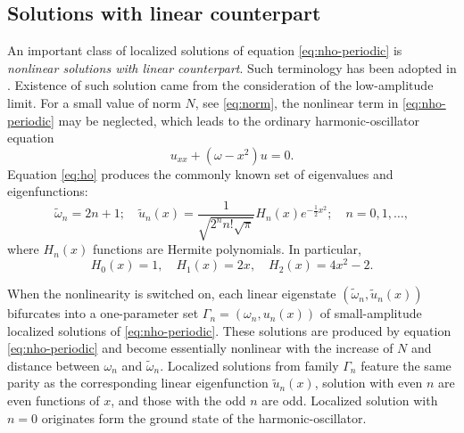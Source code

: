 \subsection{Solutions with linear counterpart}

An important class of localized solutions of equation \eqref{eq:nho-periodic} is {\it nonlinear solutions with linear counterpart}.
Such terminology has been adopted in \cite{AgostaMalomedPresilla, AgostaPresilla}.
Existence of such solution came from the consideration of the low-amplitude limit.
For a small value of norm $N$, see \eqref{eq:norm}, the nonlinear term in \eqref{eq:nho-periodic} may be neglected, which leads to the ordinary harmonic-oscillator equation
\begin{equation}
	u_{xx} + (\omega - x^2) u = 0.
\label{eq:ho}
\end{equation}
Equation \eqref{eq:ho} produces the commonly known set of eigenvalues and eigenfunctions:
\begin{equation}
	\tilde{\omega}_n = 2n + 1; \quad \tilde{u}_n(x) = \dfrac{1}{\sqrt{2^n n! \sqrt{\pi}}} H_n(x) e^{-\frac{1}{2} x^2}; \quad n = 0, 1, \dots,
\label{eq:ho-solutions}
\end{equation}
where $H_n(x)$ functions are Hermite polynomials.
In particular,
\begin{equation*}
	H_0(x) = 1, \quad H_1(x) = 2x, \quad H_2(x) = 4x^2 - 2.	
\end{equation*}

When the nonlinearity is switched on, each linear eigenstate $(\tilde{\omega}_n, \tilde{u}_n(x))$ bifurcates into a one-parameter set $\Gamma_n = (\omega_n, u_n(x))$ of small-amplitude localized solutions of \eqref{eq:nho-periodic}.
These solutions are produced by equation \eqref{eq:nho-periodic} and become essentially nonlinear with the increase of $N$ and distance between $\omega_n$ and $\tilde{\omega}_n$.
Localized solutions from family $\Gamma_n$ feature the same parity as the corresponding linear eigenfunction $\tilde{u}_n(x)$, solution with even $n$ are even functions of $x$, and those with the odd $n$ are odd.
Localized solution with $n = 0$ originates form the ground state of the harmonic-oscillator.

